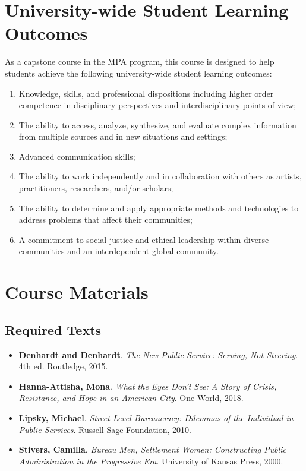 \documentclass[12pt, letterpaper]{article}
\begin{document}
\section{University-wide Student Learning Outcomes}
    As a capstone course in the MPA program, this course is designed to help students achieve the following university-wide student learning outcomes:
    \begin{enumerate}
        \item Knowledge, skills, and professional dispositions including higher order competence in disciplinary perspectives and interdisciplinary points of view;
        \item The ability to access, analyze, synthesize, and evaluate complex information from multiple sources and in new situations and settings;
        \item Advanced communication skills;
        \item The ability to work independently and in collaboration with others as artists, practitioners, researchers, and/or scholars;
        \item The ability to determine and apply appropriate methods and technologies to address problems that affect their communities; 
        \item A commitment to social justice and ethical leadership within diverse communities and an interdependent global community.
    \end{enumerate}

    \section{Course Materials}
    \subsection*{Required Texts}
    \begin{itemize}
        \item \textbf{Denhardt and Denhardt}. \textit{The New Public Service: Serving, Not Steering}. 4th ed. Routledge, 2015.
        \item \textbf{Hanna-Attisha, Mona}. \textit{What the Eyes Don't See: A Story of Crisis, Resistance, and Hope in an American City}. One World, 2018.
        \item \textbf{Lipsky, Michael}. \textit{Street-Level Bureaucracy: Dilemmas of the Individual in Public Services}. Russell Sage Foundation, 2010.
        \item \textbf{Stivers, Camilla}. \textit{Bureau Men, Settlement Women: Constructing Public Administration in the Progressive Era}. University of Kansas Press, 2000.
    \end{itemize}
\end{document}
